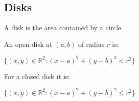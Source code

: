 
\subsection{Disks}

A disk is the area contained by a circle.

An open disk at \((a,b)\) of radius \(r\) is:

\(\{(x,y)\in \mathbb R^2:(x-a)^2+(y-b)^2 < r^2\}\)

For a closed disk it is:

\(\{(x,y)\in \mathbb R^2:(x-a)^2+(y-b)^2 \le r^2\}\)

